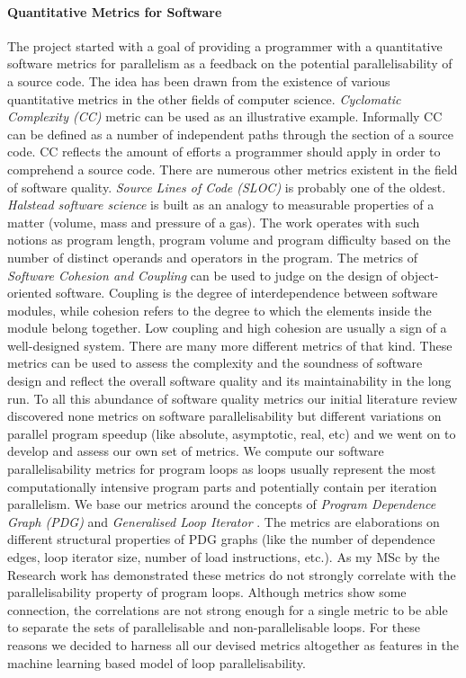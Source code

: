 \documentclass[10pt,a4paper]{report}
\begin{document}
\paragraph{Quantitative Metrics for Software} The project started with a goal of providing a programmer with a quantitative software metrics for parallelism as a feedback on the potential parallelisability of a source code. The idea has been drawn from the existence of various quantitative metrics in the other fields of computer science. \textit{Cyclomatic Complexity (CC)} metric \cite{McCabe:1976:CM:800253.807712} can be used as an illustrative example. Informally CC can be defined as a number of independent paths through the section of a source code. CC reflects the amount of efforts a programmer should apply in order to comprehend a source code. There are numerous other metrics existent in the field of software quality. \textit{Source Lines of Code (SLOC)} is probably one of the oldest. \textit{Halstead software science} \cite{Halstead:1977:ESS:540137} is built as an analogy to measurable properties of a matter (volume, mass and pressure of a gas). The work operates with such notions as program length, program volume and program difficulty based on the number of distinct operands and operators in the program. The metrics of \textit{Software Cohesion and Coupling} \cite{Stevens:1974:SD:1661066.1661068} can be used to judge on the design of object-oriented software. Coupling is the degree of interdependence between software modules, while cohesion refers to the degree to which the elements inside the module belong together. Low coupling and high cohesion are usually a sign of a well-designed system. There are many more different metrics of that kind. These metrics can be used to assess the complexity and the soundness of software design and reflect the overall software quality and its maintainability in the long run.\newline\null
\quad To all this abundance of software quality metrics our initial literature review discovered none metrics on software parallelisability but different variations on parallel program speedup (like absolute, asymptotic, real, etc) and we went on to develop and assess our own set of metrics. We compute our software parallelisability metrics for program loops as loops usually represent the most computationally intensive program parts and potentially contain per iteration parallelism. We base our metrics around the concepts of \textit{Program Dependence Graph (PDG)} \cite{Ferrante:1987:PDG:24039.24041} and \textit{Generalised Loop Iterator} \cite{Manilov:2018:GPI:3178372.3179511}. The metrics are elaborations on different structural properties of PDG graphs (like the number of dependence edges, loop iterator size, number of load instructions, etc.). As my MSc by the Research work has demonstrated these metrics do not strongly correlate with the parallelisability property of program loops. Although metrics show some connection, the correlations are not strong enough for a single metric to be able to separate the sets of parallelisable and non-parallelisable loops. For these reasons we decided to harness all our devised metrics altogether as features in the machine learning based model of loop parallelisability.
\end{document}
